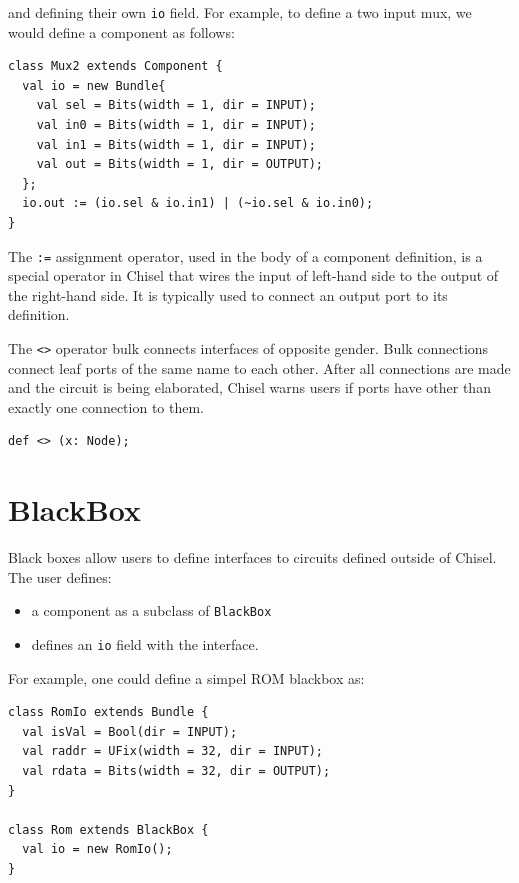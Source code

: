 \documentclass[10pt,twocolumn]{article}
\def\code#1{{\small\tt #1}}
\begin{document}
\noindent
and defining their own \code{io} field.  For example, to define a two
input mux, we would define a component as follows:

\begin{lstlisting}
class Mux2 extends Component {
  val io = new Bundle{
    val sel = Bits(width = 1, dir = INPUT);
    val in0 = Bits(width = 1, dir = INPUT);
    val in1 = Bits(width = 1, dir = INPUT);
    val out = Bits(width = 1, dir = OUTPUT);
  };
  io.out := (io.sel & io.in1) | (~io.sel & io.in0);
}
\end{lstlisting}

\noindent
The \code{:=} assignment operator, used in the body of a
component definition, is a special operator in Chisel that wires the input of
left-hand side to the output of the right-hand side.  It is typically
used to connect an output port to its definition.

The \code{<>} operator bulk connects interfaces of opposite gender.
Bulk connections connect leaf ports of the same name to each other.
After all connections are made and the circuit is being elaborated,
Chisel warns users if ports have other than exactly one connection to them.

\begin{lstlisting}
def <> (x: Node);
\end{lstlisting}


\section{BlackBox}

Black boxes allow users to define interfaces to circuits defined
outside of Chisel.  The user defines:

\begin{itemize}
\item a component as a subclass of \code{BlackBox} 
\item defines an \code{io} field with the interface.
\end{itemize}

\noindent
For example, one could define a simpel ROM blackbox as:

\begin{lstlisting}
class RomIo extends Bundle {
  val isVal = Bool(dir = INPUT);
  val raddr = UFix(width = 32, dir = INPUT);
  val rdata = Bits(width = 32, dir = OUTPUT);
}

class Rom extends BlackBox {
  val io = new RomIo();
}
\end{lstlisting}
\end{document}
